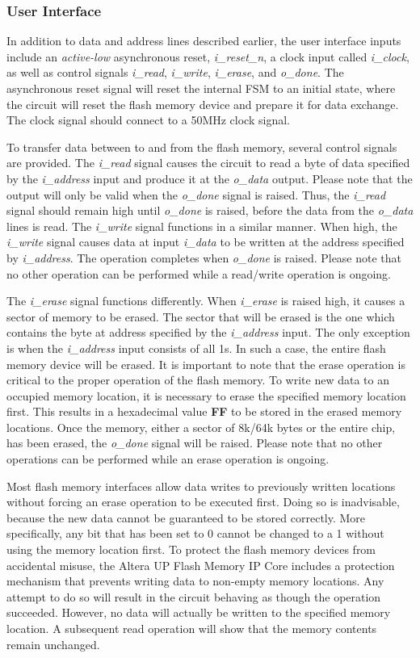 \subsubsection{User Interface}

In addition to data and address lines described earlier, the user interface inputs include an {\it active-low} asynchronous reset, {\it i\_reset\_n}, a clock input called {\it i\_clock}, as well as control signals {\it i\_read}, {\it i\_write}, {\it i\_erase}, and {\it o\_done}. The asynchronous reset signal will reset the internal FSM to an initial state, where the circuit will reset the flash memory device and prepare it for data exchange. The clock signal should connect to a 50MHz clock signal.

To transfer data between to and from the flash memory, several control signals are provided. The {\it i\_read} signal causes the circuit to read a byte of data specified by the {\it i\_address} input and produce it at the {\it o\_data} output. Please note that the output will only be valid when the {\it o\_done} signal is raised. Thus, the {\it i\_read} signal should remain high until {\it o\_done} is raised, before the data from the {\it o\_data} lines is read. The {\it i\_write} signal functions in a similar manner. When high, the {\it i\_write} signal causes data at input {\it i\_data} to be written at the address specified by {\it i\_address}. The operation completes when {\it o\_done} is raised. Please note that no other operation can be performed while a read/write operation is ongoing.

The {\it i\_erase} signal functions differently. When {\it i\_erase} is raised high, it causes a sector of memory to be erased. The sector that will be erased is the one which contains the byte at address specified by the {\it i\_address} input. The only exception is when the {\it i\_address} input consists of all 1s. In such a case, the entire flash memory device will be erased. It is important to note that the erase operation is critical to the proper operation of the flash memory. To write new data to an occupied memory location, it is necessary to erase the specified memory location first. This results in a hexadecimal value {\bf FF} to be stored in the erased memory locations. Once the memory, either a sector of 8k/64k bytes or the entire chip, has been erased, the {\it o\_done} signal will be raised.
Please note that no other operations can be performed while an erase operation is ongoing.

Most flash memory interfaces allow data writes to previously written locations without forcing an erase operation to be executed first. Doing so is inadvisable, because the new data cannot be guaranteed to be stored correctly. More specifically, any bit that has been set to 0 cannot be changed to a 1 without using the memory location first. To protect the flash memory devices from accidental misuse, the Altera UP Flash Memory IP Core includes a protection mechanism that prevents writing data to non-empty memory locations. Any attempt to do so will result in the circuit behaving as though the operation succeeded. However, no data will actually be written to the specified memory location. A subsequent read operation will show that the memory contents remain unchanged.

